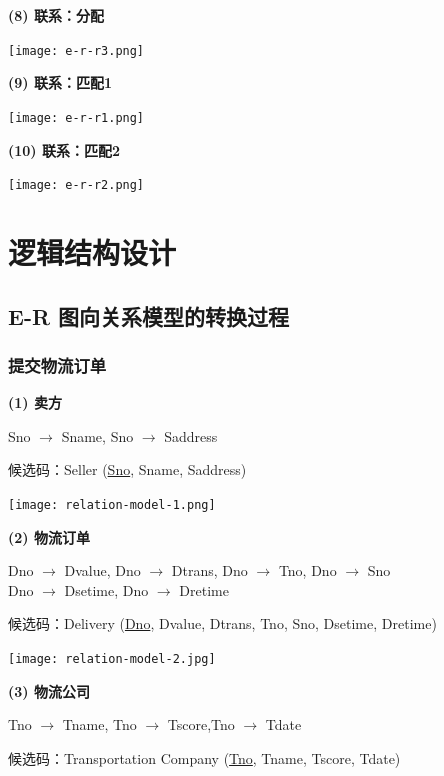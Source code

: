 \documentclass[12pt]{article}
\begin{document}
\noindent \textbf{(8) 联系：分配}

\begin{center}
	\texttt{[image: e-r-r3.png]}
\end{center}

\noindent \textbf{(9) 联系：匹配1}

\begin{center}
	\texttt{[image: e-r-r1.png]}
\end{center}

\noindent \textbf{(10) 联系：匹配2}

\begin{center}
	\texttt{[image: e-r-r2.png]}
\end{center}

\section{逻辑结构设计}

\subsection{E-R 图向关系模型的转换过程}

\subsubsection{提交物流订单}

\noindent \textbf{(1) 卖方} \par 
\noindent Sno $\rightarrow$ Sname, Sno $\rightarrow$ Saddress \par 
\noindent 候选码：Seller (\uline{Sno}, Sname, Saddress) 

\begin{center}
	\texttt{[image: relation-model-1.png]}
\end{center}

\noindent \textbf{(2) 物流订单} \par 
\noindent Dno $\rightarrow$ Dvalue, Dno $\rightarrow$ Dtrans, Dno $\rightarrow$ Tno, Dno $\rightarrow$ Sno \\
\noindent Dno $\rightarrow$ Dsetime, Dno $\rightarrow$ Dretime \par 
\noindent 候选码：Delivery (\uline{Dno}, Dvalue, Dtrans, Tno, Sno, Dsetime, Dretime)

\begin{center}
	\texttt{[image: relation-model-2.jpg]}
\end{center}

\noindent \textbf{(3) 物流公司} \par 
\noindent Tno $\rightarrow$ Tname, Tno $\rightarrow$ Tscore,Tno $\rightarrow$ Tdate \par 
\noindent 候选码：Transportation Company (\uline{Tno}, Tname, Tscore, Tdate)
\end{document}
